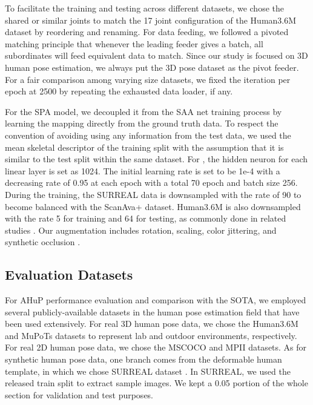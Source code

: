 \documentclass[twocolumn]{svjour3}          \smartqed  \usepackage{graphicx}
\begin{document}
To facilitate the training and testing across different datasets, we chose the shared or similar joints to match the 17 joint configuration of the Human3.6M dataset by reordering and renaming. 
For data feeding, we followed a pivoted matching principle that whenever the leading feeder gives a batch, all subordinates will feed equivalent data to match. Since our study is focused on 3D human pose estimation, we always put the 3D pose dataset as the pivot feeder. For a fair comparison among varying size datasets, we fixed the iteration per epoch at 2500 by repeating the exhausted data loader, if any.  

For the SPA model, we decoupled it from the SAA net training process by learning the mapping directly from the ground truth data. 
To respect the convention of avoiding using any information from the test data, 
we used the mean skeletal descriptor  of the training split with the assumption that it is similar to the test split within the same dataset. 
For , the hidden neuron for each linear layer is set as 1024. 
The initial learning rate is set to be 1e-4 with a decreasing rate of 0.95 at each epoch with a total 70 epoch and batch size 256. 
During the training, the SURREAL data is downsampled with the rate of 90 to become balanced with the ScanAva+ dataset. Human3.6M is also downsampled with the rate 5 for training and 64 for testing, as commonly done in related studies \cite{moon2019camera,lassner2017unite,yasin2016dual,sun2017compositional,sun2018integral}. 
Our augmentation includes rotation, scaling, color jittering, and synthetic occlusion \cite{zhong2017random}.

\subsection{Evaluation Datasets}
For AHuP performance evaluation and comparison with the SOTA, we employed several publicly-available datasets in the human pose estimation field that have been  used extensively. For real 3D human pose data, we chose the Human3.6M \cite{h36m_pami} and MuPoTs \cite{singleshotmultiperson2018} datasets to represent lab and outdoor environments, respectively. For real 2D human pose data, we chose the MSCOCO \cite{lin2014microsoft} and MPII  \cite{andriluka20142d} datasets. As for synthetic human pose data, one branch comes from the deformable human template, in which we chose SURREAL dataset \cite{varol17_surreal}. In SURREAL, we used the released train split to extract sample images. We kept a 0.05 portion of the whole section for validation and test purposes. 
\end{document}
